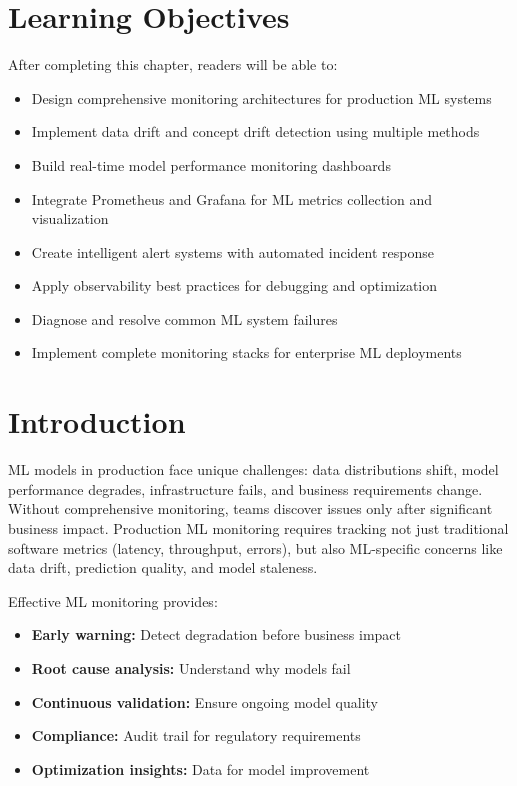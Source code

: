 \section{Learning Objectives}

After completing this chapter, readers will be able to:
\begin{itemize}
    \item Design comprehensive monitoring architectures for production ML systems
    \item Implement data drift and concept drift detection using multiple methods
    \item Build real-time model performance monitoring dashboards
    \item Integrate Prometheus and Grafana for ML metrics collection and visualization
    \item Create intelligent alert systems with automated incident response
    \item Apply observability best practices for debugging and optimization
    \item Diagnose and resolve common ML system failures
    \item Implement complete monitoring stacks for enterprise ML deployments
\end{itemize}

\section{Introduction}

ML models in production face unique challenges: data distributions shift, model performance degrades, infrastructure fails, and business requirements change. Without comprehensive monitoring, teams discover issues only after significant business impact. Production ML monitoring requires tracking not just traditional software metrics (latency, throughput, errors), but also ML-specific concerns like data drift, prediction quality, and model staleness.

Effective ML monitoring provides:
\begin{itemize}
    \item \textbf{Early warning:} Detect degradation before business impact
    \item \textbf{Root cause analysis:} Understand why models fail
    \item \textbf{Continuous validation:} Ensure ongoing model quality
    \item \textbf{Compliance:} Audit trail for regulatory requirements
    \item \textbf{Optimization insights:} Data for model improvement
\end{itemize}

